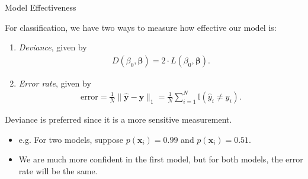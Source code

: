 \documentclass[8pt]{beamer}
\newcommand{\mys}{\vspace{0.5cm} %
}
\begin{document}
\begin{frame}{Model Effectiveness}

For classification, we have two ways to measure how effective our model is:
\begin{enumerate}
    \item \textit{Deviance}, given by 
    \begin{align*}
        D(\beta_0, \bm{\beta}) = 2 \cdot L(\beta_0, \bm{\beta}).
    \end{align*}
    \item \textit{Error rate}, given by 
    \begin{align*}
        \mathrm{error} = \frac{1}{N} \| \hat{\mathbf{y}} - \mathbf{y}\|_1 = \frac{1}{N} \sum_{i=1}^N \mathbb{I}(\hat{y}_i \not = y_i).
    \end{align*}
\end{enumerate} \mys

Deviance is preferred since it is a more sensitive measurement.
\begin{itemize}
    \item e.g. For two models, suppose $p(\bm{x}_i) = 0.99$ and $p(\bm{x}_i) = 0.51$.
    \item We are much more confident in the first model, but for both models, the error rate will be the same.
\end{itemize} %

    
\end{frame}
\end{document}
